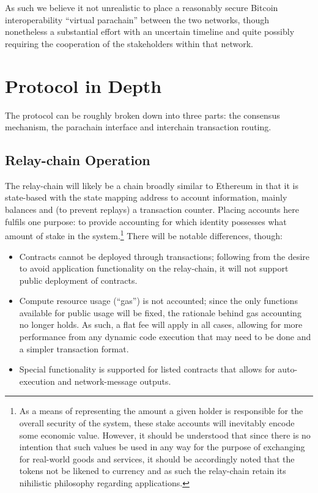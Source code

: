 \documentclass[9pt,oneside]{amsart}
\begin{document}
\begin{multicols}{2}
 As such we believe it not unrealistic to place a reasonably secure Bitcoin interoperability ``virtual parachain'' between the two networks, though nonetheless a substantial effort with an uncertain timeline and quite possibly requiring the cooperation of the stakeholders within that network.

\section{Protocol in Depth}\label{protocol-in-depth}

 The protocol can be roughly broken down into three parts: the consensus mechanism, the parachain interface and interchain transaction routing.

\subsection{Relay-chain Operation}\label{relay-chain-operation}

 The relay-chain will likely be a chain broadly similar to Ethereum in that it is state-based with the state mapping address to account information, mainly balances and (to prevent replays) a transaction counter. Placing accounts here fulfils one purpose: to provide accounting for which identity possesses what amount of stake in the system.\footnote{As a means of representing the amount a given holder is responsible for the overall security of the system, these stake accounts will inevitably encode some economic value. However, it should be understood that since there is no intention that such values be used in any way for the purpose of exchanging for real-world goods and services, it should be accordingly noted that the tokens not be likened to currency and as such the relay-chain retain its nihilistic philosophy regarding applications.} There will be notable differences, though:

\begin{itemize}
\item Contracts cannot be deployed through transactions; following from the desire to avoid application functionality on the relay-chain, it will not support public deployment of contracts.
\item Compute resource usage (``gas'') is not accounted; since the only functions available for public usage will be fixed, the rationale behind gas accounting no longer holds. As such, a flat fee will apply in all cases, allowing for more performance from any dynamic code execution that may need to be done and a simpler transaction format.
\item Special functionality is supported for listed contracts that allows for auto-execution and network-message outputs.
\end{itemize}


\end{multicols}
\end{document}
